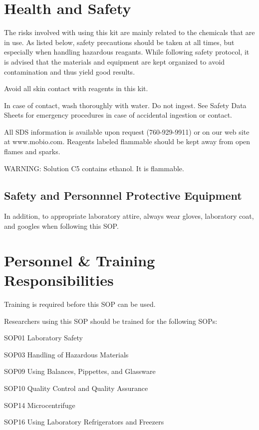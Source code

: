 \documentclass[12pt]{../SOP3_alpha}\usepackage[]{graphicx}\usepackage[]{color}
\begin{document}
\section{Health and Safety}

\NP The risks involved with using this kit are mainly related to the chemicals that are in use. As listed below, safety precautions should be taken at all times, but especially when handling hazardous reagants. While following safety protocol, it is advised that the materials and equipment are kept organized to avoid contamination and thus yield good results. 

\NP Avoid all skin contact with reagents in this kit. 

\NP In case of contact, wash thoroughly with water. Do not
ingest. See Safety Data Sheets for emergency procedures in case
of accidental ingestion or contact. 

\NP All SDS information is available upon request (760-929-9911) or on our web site at www.mobio.com. Reagents labeled flammable should be kept away from open flames and sparks.

\NP WARNING: Solution C5 contains ethanol. It is flammable. 
 
\subsection {Safety and Personnnel Protective Equipment}

\NP In addition, to appropriate laboratory attire, always wear gloves, laboratory coat, and googles when following this SOP.

\section{Personnel \& Training Responsibilities}

\NP Training is required before this SOP can be used. 

\NP Researchers using this SOP should be trained for the following SOPs:

\begin{itemize*}
  \item SOP01 Laboratory Safety
  \item SOP03 Handling of Hazardous Materials
  \item SOP09 Using Balances, Pippettes, and Glassware
  \item SOP10 Quality Control and Quality Assurance
  \item SOP14 Microcentrifuge
  \item SOP16 Using Laboratory Refrigerators and Freezers
\end{itemize*}
\end{document}
